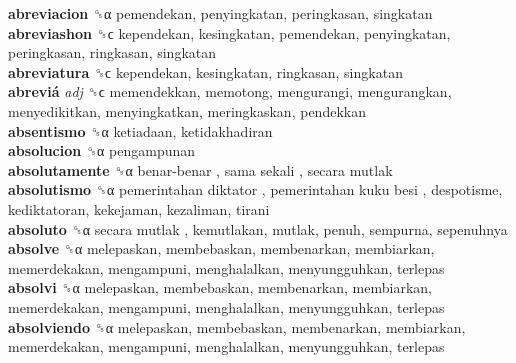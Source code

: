 \textbf{abreviacion} ␝α  pemendekan, penyingkatan, peringkasan, singkatan  \\
\textbf{abreviashon} ␝ϲ  kependekan, kesingkatan, pemendekan, penyingkatan, peringkasan, ringkasan, singkatan  \\
\textbf{abreviatura} ␝ϲ  kependekan, kesingkatan, ringkasan, singkatan  \\
\textbf{abreviá} \emph{adj}  ␝ϲ  memendekkan, memotong, mengurangi, mengurangkan, menyedikitkan, menyingkatkan, meringkaskan, pendekkan  \\
\textbf{absentismo} ␝α  ketiadaan, ketidakhadiran  \\
\textbf{absolucion} ␝α  pengampunan  \\
\textbf{absolutamente} ␝α   benar-benar ,  sama sekali ,  secara mutlak   \\
\textbf{absolutismo} ␝α   pemerintahan diktator ,  pemerintahan kuku besi , despotisme, kediktatoran, kekejaman, kezaliman, tirani  \\
\textbf{absoluto} ␝α   secara mutlak , kemutlakan, mutlak, penuh, sempurna, sepenuhnya  \\
\textbf{absolve} ␝α  melepaskan, membebaskan, membenarkan, membiarkan, memerdekakan, mengampuni, menghalalkan, menyungguhkan, terlepas  \\
\textbf{absolvi} ␝α  melepaskan, membebaskan, membenarkan, membiarkan, memerdekakan, mengampuni, menghalalkan, menyungguhkan, terlepas  \\
\textbf{absolviendo} ␝α  melepaskan, membebaskan, membenarkan, membiarkan, memerdekakan, mengampuni, menghalalkan, menyungguhkan, terlepas  \\
